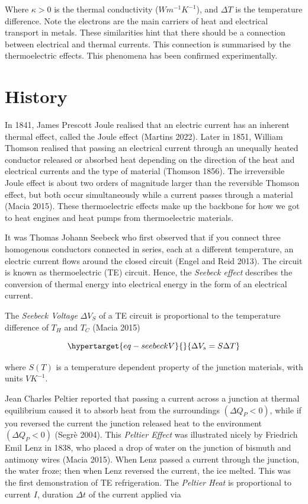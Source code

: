 \documentclass[
  letterpaper,
  DIV=11,
  numbers=noendperiod]{scrreprt}
\begin{document}
Where \(\kappa > 0\) is the thermal conductivity (\(Wm^{- 1}K^{- 1}\)),
and \(\Delta T\) is the temperature difference. Note the electrons are
the main carriers of heat and electrical transport in metals. These
similarities hint that there should be a connection between electrical
and thermal currents. This connection is summarised by the
thermoelectric effects. This phenomena has been confirmed
experimentally.

\hypertarget{history}{%
\section{History}\label{history}}

In 1841, James Prescott Joule realised that an electric current has an
inherent thermal effect, called the Joule effect (Martins 2022). Later
in 1851, William Thomson realised that passing an electrical current
through an unequally heated conductor released or absorbed heat
depending on the direction of the heat and electrical currents and the
type of material (Thomson 1856). The irreversible Joule effect is about
two orders of magnitude larger than the reversible Thomson effect, but
both occur simultaneously while a current passes through a material
(Macia 2015). These thermoelectric effects make up the backbone for how
we got to heat engines and heat pumps from thermoelectric materials.

It was Thomas Johann Seebeck who first observed that if you connect
three homogenous conductors connected in series, each at a different
temperature, an electric current flows around the closed circuit (Engel
and Reid 2013). The circuit is known as thermoelectric (TE) circuit.
Hence, the \emph{Seebeck effect} describes the conversion of thermal
energy into electrical energy in the form of an electrical current.

The \emph{Seebeck Voltage} \(\Delta V_{S}\) of a TE circuit is
proportional to the temperature difference of \(T_{H}\) and \(T_{C}\)
(Macia 2015)

\begin{equation}\protect\hypertarget{eq-seebeckV}{}{\Delta V_{s} = S\Delta T}\label{eq-seebeckV}\end{equation}

where \(S(T)\) is a temperature dependent property of the junction
materials, with units \(VK^{- 1}\).

Jean Charles Peltier reported that passing a current across a junction
at thermal equilibrium caused it to absorb heat from the surroundings
\(\left( \Delta Q_{P} < 0 \right)\), while if you reversed the current
the junction released heat to the environment
\(\left( \Delta Q_{P} < 0 \right)\) (Segrè 2004). This \emph{Peltier
Effect} was illustrated nicely by Friedrich Emil Lenz in 1838, who
placed a drop of water on the junction of bismuth and antimony wires
(Macia 2015). When Lenz passed a current through the junction, the water
froze; then when Lenz reversed the current, the ice melted. This was the
first demonstration of TE refrigeration. The \emph{Peltier Heat} is
proportional to current \(I\), duration \(\Delta t\) of the current
applied via
\end{document}
